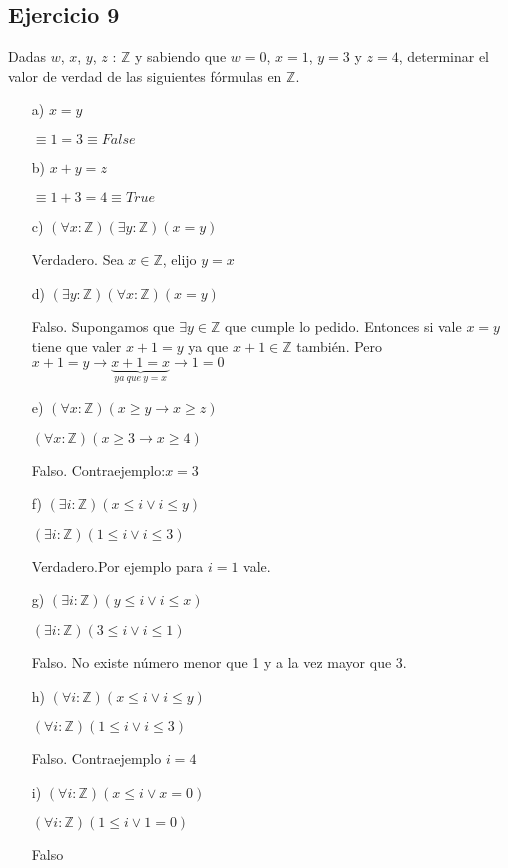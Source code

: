 \documentclass[10pt,a4paper]{article}
\begin{document}
\subsection*{Ejercicio 9}
Dadas $w$, $x$, $y$, $z$ : $\mathbb{Z}$ y sabiendo que $w = 0$, $x = 1$, $y = 3$ y $z = 4$, determinar el valor de verdad de las siguientes fórmulas en $\mathbb{Z}$.
\begin{enumerate}
\item[a)]$x = y$

$\equiv 1=3 \equiv False$

\item[b)]$x + y = z$

$\equiv 1+3=4 \equiv True$

\item[c)]$(\forall x : \mathbb{Z})(\exists y : \mathbb{Z})(x = y)$

Verdadero. Sea $x \in \mathbb{Z}$, elijo $y=x$

\item[d)]$(\exists y : \mathbb{Z})(\forall x : \mathbb{Z})(x = y)$

Falso. Supongamos que $\exists y\in \mathbb{Z}$ que cumple lo pedido. Entonces si vale $x=y$ tiene que valer $x+1=y$ ya que $x+1\in \mathbb{Z}$ también. Pero $x+1=y \rightarrow \underbrace{x+1=x}_{ya\ que\ y=x}\rightarrow 1=0$

\item[e)]$(\forall x : \mathbb{Z})(x \geq y \rightarrow x \geq z)$

$(\forall x : \mathbb{Z})(x \geq 3 \rightarrow x \geq 4)$

Falso. Contraejemplo:$x=3$

\item[f)]$(\exists i : \mathbb{Z})(x \leq i \vee i \leq y)$

$(\exists i : \mathbb{Z})(1 \leq i \vee i \leq 3)$

Verdadero.Por ejemplo para $i=1$ vale.

\item[g)]$(\exists i : \mathbb{Z})(y \leq i \vee i \leq x)$

$(\exists i : \mathbb{Z})(3 \leq i \vee i \leq 1)$

Falso. No existe número menor que 1 y a la vez mayor que 3.

\item[h)]$(\forall i : \mathbb{Z})(x \leq i \vee i \leq y)$

$(\forall i : \mathbb{Z})(1 \leq i \vee i \leq 3)$

Falso. Contraejemplo $i=4$

\item[i)]$(\forall i : \mathbb{Z})(x \leq i \vee x = 0)$

$(\forall i : \mathbb{Z})(1 \leq i \vee 1 = 0)$

Falso
\end{enumerate}
\end{document}
